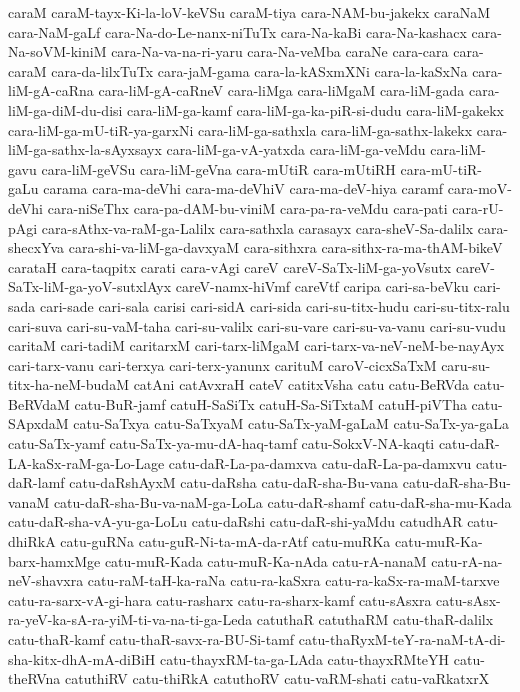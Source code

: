 {caraM
caraM-tayx-Ki-la-loV-keVSu
caraM-tiya
cara-NAM-bu-jakekx
caraNaM
cara-NaM-gaLf
cara-Na-do-Le-nanx-niTuTx
cara-Na-kaBi
cara-Na-kashacx
cara-Na-soVM-kiniM
cara-Na-va-na-ri-yaru
cara-Na-veMba
caraNe
cara-cara
cara-caraM
cara-da-lilxTuTx
cara-jaM-gama
cara-la-kASxmXNi
cara-la-kaSxNa
cara-liM-gA-caRna
cara-liM-gA-caRneV
cara-liMga
cara-liMgaM
cara-liM-gada
cara-liM-ga-diM-du-disi
cara-liM-ga-kamf
cara-liM-ga-ka-piR-si-dudu
cara-liM-gakekx
cara-liM-ga-mU-tiR-ya-garxNi
cara-liM-ga-sathxla
cara-liM-ga-sathx-lakekx
cara-liM-ga-sathx-la-sAyxsayx
cara-liM-ga-vA-yatxda
cara-liM-ga-veMdu
cara-liM-gavu
cara-liM-geVSu
cara-liM-geVna
cara-mUtiR
cara-mUtiRH
cara-mU-tiR-gaLu
carama
cara-ma-deVhi
cara-ma-deVhiV
cara-ma-deV-hiya
caramf
cara-moV-deVhi
cara-niSeThx
cara-pa-dAM-bu-viniM
cara-pa-ra-veMdu
cara-pati
cara-rU-pAgi
cara-sAthx-va-raM-ga-Lalilx
cara-sathxla
carasayx
cara-sheV-Sa-dalilx
cara-shecxYva
cara-shi-va-liM-ga-davxyaM
cara-sithxra
cara-sithx-ra-ma-thAM-bikeV
carataH
cara-taqpitx
carati
cara-vAgi
careV
careV-SaTx-liM-ga-yoVsutx
careV-SaTx-liM-ga-yoV-sutxlAyx
careV-namx-hiVmf
careVtf
caripa
cari-sa-beVku
cari-sada
cari-sade
cari-sala
carisi
cari-sidA
cari-sida
cari-su-titx-hudu
cari-su-titx-ralu
cari-suva
cari-su-vaM-taha
cari-su-valilx
cari-su-vare
cari-su-va-vanu
cari-su-vudu
caritaM
cari-tadiM
caritarxM
cari-tarx-liMgaM
cari-tarx-va-neV-neM-be-nayAyx
cari-tarx-vanu
cari-terxya
cari-terx-yanunx
carituM
caroV-cicxSaTxM
caru-su-titx-ha-neM-budaM
catAni
catAvxraH
cateV
catitxVsha
catu
catu-BeRVda
catu-BeRVdaM
catu-BuR-jamf
catuH-SaSiTx
catuH-Sa-SiTxtaM
catuH-piVTha
catu-SApxdaM
catu-SaTxya
catu-SaTxyaM
catu-SaTx-yaM-gaLaM
catu-SaTx-ya-gaLa
catu-SaTx-yamf
catu-SaTx-ya-mu-dA-haq-tamf
catu-SokxV-NA-kaqti
catu-daR-LA-kaSx-raM-ga-Lo-Lage
catu-daR-La-pa-damxva
catu-daR-La-pa-damxvu
catu-daR-lamf
catu-daRshAyxM
catu-daRsha
catu-daR-sha-Bu-vana
catu-daR-sha-Bu-vanaM
catu-daR-sha-Bu-va-naM-ga-LoLa
catu-daR-shamf
catu-daR-sha-mu-Kada
catu-daR-sha-vA-yu-ga-LoLu
catu-daRshi
catu-daR-shi-yaMdu
catudhAR
catu-dhiRkA
catu-guRNa
catu-guR-Ni-ta-mA-da-rAtf
catu-muRKa
catu-muR-Ka-barx-hamxMge
catu-muR-Kada
catu-muR-Ka-nAda
catu-rA-nanaM
catu-rA-na-neV-shavxra
catu-raM-taH-ka-raNa
catu-ra-kaSxra
catu-ra-kaSx-ra-maM-tarxve
catu-ra-sarx-vA-gi-hara
catu-rasharx
catu-ra-sharx-kamf
catu-sAsxra
catu-sAsx-ra-yeV-ka-sA-ra-yiM-ti-va-na-ti-ga-Leda
catuthaR
catuthaRM
catu-thaR-dalilx
catu-thaR-kamf
catu-thaR-savx-ra-BU-Si-tamf
catu-thaRyxM-teY-ra-naM-tA-di-sha-kitx-dhA-mA-diBiH
catu-thayxRM-ta-ga-LAda
catu-thayxRMteYH
catu-theRVna
catuthiRV
catu-thiRkA
catuthoRV
catu-vaRM-shati
catu-vaRkatxrX
}
